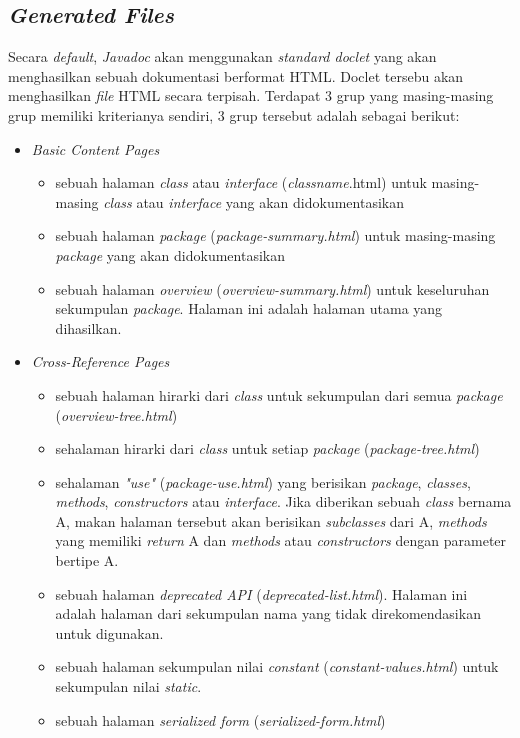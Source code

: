 \subsection{\textit{Generated Files}}
\label{sec:generated-files}
Secara {\it default}, {\it Javadoc} akan menggunakan {\it standard doclet} yang akan menghasilkan sebuah dokumentasi berformat HTML. Doclet tersebu akan menghasilkan {\it file} HTML secara terpisah. Terdapat 3 grup yang masing-masing grup memiliki kriterianya sendiri, 3 grup tersebut adalah sebagai berikut:
\begin{itemize}
	\item {\it Basic Content Pages}
	\begin{itemize}
		\item sebuah halaman {\it class} atau {\it interface} ({\it classname}.html) untuk masing-masing {\it class} atau {\it interface} yang akan didokumentasikan
		\item sebuah halaman {\it package} ({\it package-summary.html}) untuk masing-masing {\it package} yang akan didokumentasikan
		\item sebuah halaman {\it overview} ({\it overview-summary.html}) untuk keseluruhan sekumpulan {\it package}. Halaman ini adalah halaman utama yang dihasilkan.
	\end{itemize}
	\item {\it Cross-Reference Pages}
	\begin{itemize}
		\item sebuah halaman hirarki dari {\it class} untuk sekumpulan dari semua {\it package} ({\it overview-tree.html})
		\item sehalaman hirarki dari {\it class} untuk setiap {\it package} ({\it package-tree.html})
		\item sehalaman {\it "use"} ({\it package-use.html}) yang berisikan {\it package}, {\it classes}, {\it methods}, {\it constructors} atau {\it interface}. Jika diberikan sebuah {\it class} bernama A, makan halaman tersebut akan berisikan {\it subclasses} dari A, {\it methods} yang memiliki {\it return} A dan {\it methods} atau {\it constructors} dengan parameter bertipe A.
		\item sebuah halaman {\it deprecated API} ({\it deprecated-list.html}). Halaman ini adalah halaman dari sekumpulan nama yang tidak direkomendasikan untuk digunakan.
		\item sebuah halaman sekumpulan nilai {\it constant} ({\it constant-values.html}) untuk sekumpulan nilai {\it static}.
		\item sebuah halaman {\it serialized form} ({\it serialized-form.html})

\end{itemize}
\end{itemize}
